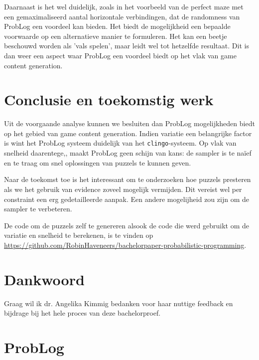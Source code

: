 \documentclass{article}
\begin{document}
	Daarnaast is het wel duidelijk, zoals in het voorbeeld van de perfect maze met een gemaximaliseerd aantal horizontale verbindingen, dat de randomness van ProbLog een voordeel kan bieden. Het biedt de mogelijkheid een bepaalde voorwaarde op een alternatieve manier te formuleren. Het kan een beetje beschouwd worden als 'vals spelen', maar leidt wel tot hetzelfde resultaat. Dit is dan weer een aspect waar ProbLog een voordeel biedt op het vlak van game content generation.
	
\section{Conclusie en toekomstig werk}
Uit de voorgaande analyse kunnen we besluiten dan ProbLog mogelijkheden biedt op het gebied van game content generation. Indien variatie een belangrijke factor is wint het ProbLog systeem duidelijk van het \texttt{clingo}-systeem. Op vlak van snelheid daarentege,, maakt ProbLog geen schijn van kans: de sampler is te na\"ief en te traag om snel oplossingen van puzzels te kunnen geven.

Naar de toekomst toe is het interessant om te onderzoeken hoe puzzels presteren als we het gebruik van evidence zoveel mogelijk vermijden. Dit vereist wel per constraint een erg gedetailleerde aanpak. Een andere mogelijheid zou zijn om de sampler te verbeteren.

De code om de puzzels zelf te genereren alsook de code die werd gebruikt om de variatie en snelheid te berekenen, is te vinden op \url{https://github.com/RobinHaveneers/bachelorpaper-probabilistic-programming}.

\section*{Dankwoord}
Graag wil ik dr. Angelika Kimmig bedanken voor haar nuttige feedback en bijdrage bij het hele proces van deze bachelorproef.





\newpage

\appendix

\section{ProbLog}
\end{document}
